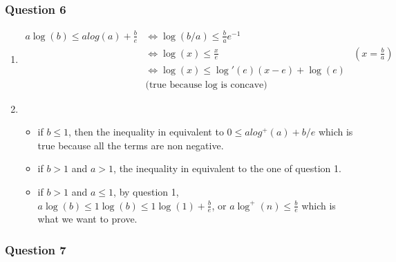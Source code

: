 \documentclass[12pt]{article}
\newcommand{\Q}[1]{\subsubsection*{Question #1}}
\begin{document}
\Q{6}
\begin{enumerate}
\item
  \begin{align*}
    a\log(b) \le a log(a) + \frac b e
    &\iff \log(b/a) \le \frac b a e^{-1}
    \\&\iff  \log(x) \le \frac x e 
    & (x = \frac b a)
    \\ & \iff \log(x) \le \log'(e) (x-e) + \log(e)\\ &\text{(true because $\log$ is concave)}
  \end{align*}

\item
  \begin{itemize}
  \item if $b \le 1$, then the inequality in equivalent to $0 \le a log^+(a) + b/e$ which is true because all the terms are non negative.
  \item if $b > 1$ and $a > 1$, the inequality in equivalent to the one of question 1.
  \item if $b > 1$ and $a \le 1$, by question 1, $a\log(b) \le 1 \log(b) \le 1 \log(1) + \frac{b}e$, or $a \log^+(n) \le \frac{b}{e}$ which is what we want to prove.
  \end{itemize}
  
\end{enumerate}

\Q{7}
\end{document}

